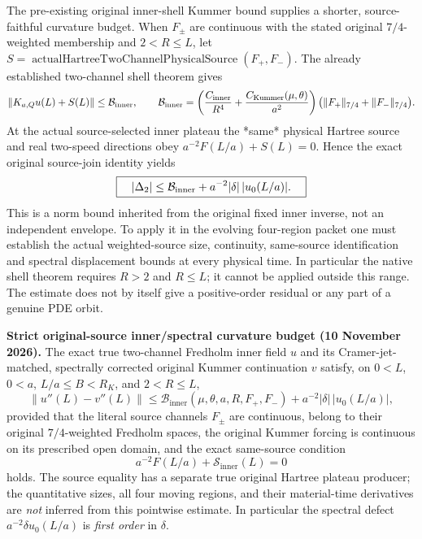 \documentclass[11pt]{amsart}
\begin{document}
The pre-existing original inner-shell Kummer bound supplies a
shorter, source-faithful curvature budget. When \(F_\pm\) are
continuous with the stated original \(7/4\)-weighted membership
and \(2<R\le L\), let
\(S=\operatorname{actualHartreeTwoChannelPhysicalSource}
 (F_+,F_-)\).
The already established two-channel shell theorem gives
\[
\|K_{a,Q}u(L)+S(L)\|
\le \mathcal B_{\rm inner},\qquad
\mathcal B_{\rm inner}
=\left(\frac{C_{\rm inner}}{R^4}
+\frac{C_{\rm Kummer}(\mu,\theta)}{a^2}\right)
\bigl(\|F_+\|_{7/4}+\|F_-\|_{7/4}\bigr).
\]
At the actual source-selected inner plateau the *same*
physical Hartree source and real two-speed directions obey
\(a^{-2}F(L/a)+S(L)=0\). Hence the exact original
source-join identity yields
\[
\boxed{\quad
|\Delta_2|\le\mathcal B_{\rm inner}
+a^{-2}|\delta|\,|u_0(L/a)|.\quad}
\]
This is a norm bound inherited from the original fixed inner
inverse, not an independent envelope. To apply it in the
evolving four-region packet one must establish the actual
weighted-source size, continuity, same-source identification
and spectral displacement bounds at every physical time.
In particular the native shell theorem requires \(R>2\)
and \(R\le L\); it cannot be applied outside this range.
The estimate does not by itself give a positive-order
residual or any part of a genuine PDE orbit.

\medskip
\noindent\textbf{Strict original-source inner/spectral curvature
budget (10 November 2026).}
The exact true two-channel Fredholm inner field $u$ and its
Cramer-jet-matched, spectrally corrected original Kummer continuation $v$
satisfy, on $0<L$, $0<a$, $L/a\le B<R_K$, and $2<R\le L$,
\[
 \|u''(L)-v''(L)\|
 \le \mathcal B_{\mathrm{inner}}(\mu,\theta,a,R,F_+,F_-)
       +a^{-2}|\delta|\,|u_0(L/a)|,
\]
provided that the literal source channels $F_\pm$ are continuous,
belong to their original $7/4$-weighted Fredholm spaces, the
original Kummer forcing is continuous on its prescribed open domain,
and the exact same-source condition
\[
 a^{-2}F(L/a)+\mathcal S_{\mathrm{inner}}(L)=0
\]
holds.  The source equality has a separate true original Hartree
plateau producer; the quantitative sizes, all four moving regions,
and their material-time derivatives are \emph{not} inferred from this
pointwise estimate.  In particular the spectral defect
$a^{-2}\delta u_0(L/a)$ is \emph{first order} in $\delta$.
\end{document}
